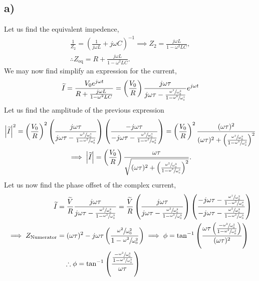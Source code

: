 \documentclass[
	12pt,
	]{article}
\theoremstyle{definition}
\theoremstyle{definition}
\theoremstyle{definition}
\theoremstyle{definition}
\theoremstyle{definition}
\theoremstyle{example}
\theoremstyle{note}
\theoremstyle{remark}
\theoremstyle{example}
\begin{document}
 			\subsection*{a) }
 				Let us find the equivalent impedence, 
 				\begin{gather*}
 					\frac{1}{Z_{2}} = \left(\frac{1}{j\omega L} + j\omega C\right)^{-1} \implies Z_{2} = \frac{j\omega L}{1-\omega^{2} L C} ,  \\
 					\therefore Z_{\text{eq}} = R + \frac{j\omega L}{1-\omega^{2} L C}.
 				\end{gather*}
 				We may now find simplify an expression for the current, 
 				\begin{gather*}
 					\widetilde{I} = \frac{V_{0} e^{j\omega t}}{R + \frac{j\omega L}{1-\omega^{2} L C}} = \left(\frac{V_{0}}{R}\right) \frac{j\omega\tau}{j\omega\tau - \frac{\sfrac{\omega^{2}}{\omega_{0}^{2}}}{1-\sfrac{\omega^{2}}{\omega_{0}^{2}} }} e^{j\omega t}
 				\end{gather*}
 				Let us find the amplitude of the previous expression 	
 				\begin{gather*}
 					\abs{\widetilde{I}}^{2} = \left(\frac{V_{0}}{R}\right)^{2}\left(\frac{j\omega\tau}{j\omega\tau - \frac{\sfrac{\omega^{2}}{\omega_{0}^{2}}}{1-\sfrac{\omega^{2}}{\omega_{0}^{2}} }}\right)\left(\frac{-j\omega\tau}{-j\omega\tau - \frac{\sfrac{\omega^{2}}{\omega_{0}^{2}}}{1-\sfrac{\omega^{2}}{\omega_{0}^{2}} }} \right) = \left(\frac{V_{0}}{R}\right)^{2}\frac{(\omega\tau)^{2}}{(\omega\tau)^{2} + \left(\frac{\sfrac{\omega^{2}}{\omega_{0}^{2}}}{1-\sfrac{\omega^{2}}{\omega_{0}^{2}}}\right)^{2}} \\
 					\implies \abs{\widetilde{I}} = \left(\frac{V_{0}}{R}\right)\frac{\omega\tau}{\sqrt{(\omega\tau)^{2} + \left(\frac{\sfrac{\omega^{2}}{\omega_{0}^{2}}}{1-\sfrac{\omega^{2}}{\omega_{0}^{2}}}\right)^{2}}}.
 				\end{gather*}
 				Let us now find the phase offset of the complex current, 
 				\begin{align*}
 					\widetilde{I} &= \frac{\widetilde{V}}{R} \frac{j\omega\tau}{j\omega\tau - \frac{\sfrac{\omega^{2}}{\omega_{0}^{2}}}{1-\sfrac{\omega^{2}}{\omega_{0}^{2}}}} = \frac{\widetilde{V}}{R}\left(\frac{j\omega\tau}{j\omega\tau - \frac{\sfrac{\omega^{2}}{\omega_{0}^{2}}}{1-\sfrac{\omega^{2}}{\omega_{0}^{2}}}}\right)\left(\frac{-j\omega\tau - \frac{\sfrac{\omega^{2}}{\omega_{0}^{2}}}{1-\sfrac{\omega^{2}}{\omega_{0}^{2}}}}{-j\omega\tau -\frac{\sfrac{\omega^{2}}{\omega_{0}^{2}}}{1-\sfrac{\omega^{2}}{\omega_{0}^{2}}}}\right) \\
 					\implies Z_{\text{Numerator}} &= (\omega\tau)^{2} - j\omega\tau\left(\frac{\sfrac{\omega^{2}}{\omega_{0}^{2}}}{1-\sfrac{\omega^{2}}{\omega_{0}^{2}}}\right) \implies \phi = \tan^{-1} \left(\frac{\omega\tau\left(\frac{-\sfrac{\omega^{2}}{\omega_{0}^{2}}}{1-\sfrac{\omega^{2}}{\omega_{0}^{2}}}\right)}{(\omega\tau)^{2}}\right) \\
 					& \quad \therefore \phi = \tan^{-1}\left(\frac{\frac{-\sfrac{\omega^{2}}{\omega_{0}^{2}}}{1-\sfrac{\omega^{2}}{\omega_{0}^{2}}}}{\omega\tau}\right)
 				\end{align*}
\end{document}
